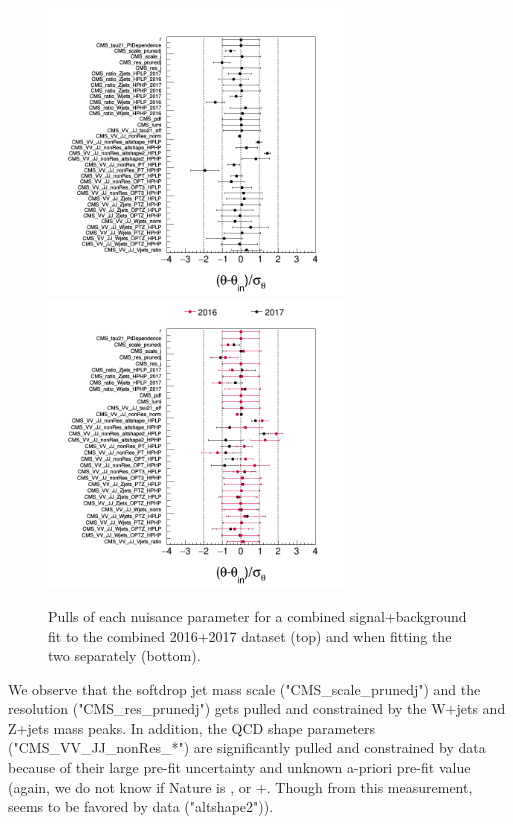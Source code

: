 \begin{figure}[h!]
\centering
\includegraphics[width=0.7\textwidth]{figures/analysis/search3/AN-17-303/postfitchecks/pulls_Combo1617.png}\\
\includegraphics[width=0.7\textwidth]{figures/analysis/search3/AN-17-303/postfitchecks/pulls_16_vs_17.png}
\caption{Pulls of each nuisance parameter for a combined signal+background fit to the combined 2016+2017 dataset (top) and when fitting the two separately (bottom).}
\label{fig:searchIII:pullsCombo1617}
\end{figure}
We observe that the softdrop jet mass scale ("CMS\_scale\_prunedj") and the resolution ("CMS\_res\_prunedj") gets pulled and constrained by the W+jets and Z+jets mass peaks. In addition, the QCD shape parameters ("CMS\_VV\_JJ\_nonRes\_*") are significantly pulled and constrained by data because of their large pre-fit uncertainty and unknown a-priori pre-fit value (again, we do not know if Nature is , \HERWIG{++} or \MADGRAPH{}+. Though from this measurement, \HERWIG{++} seems to be favored by data ("altshape2")).

